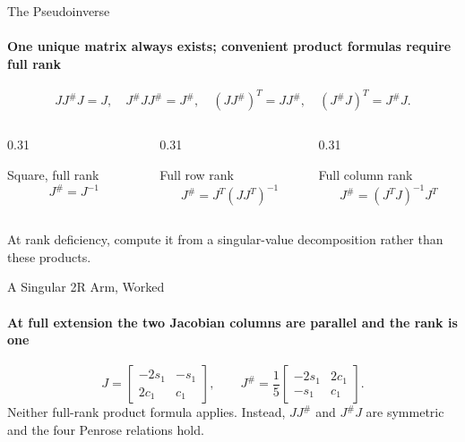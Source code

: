 \documentclass[aspectratio=169]{beamer}
\begin{document}
\begin{frame}[t]{The Pseudoinverse}
    \framesubtitle{One unique matrix always exists; convenient product formulas require full rank}
    \small
    \[
        JJ^{\#}J=J,\quad J^{\#}JJ^{\#}=J^{\#},\quad
        (JJ^{\#})^T=JJ^{\#},\quad(J^{\#}J)^T=J^{\#}J.
    \]
    \begin{columns}[T,onlytextwidth]
        \begin{column}{0.31\textwidth}
            \begin{block}{Square, full rank}
                \[
                    J^{\#}=J^{-1}
                \]
            \end{block}
        \end{column}
        \begin{column}{0.31\textwidth}
            \begin{block}{Full row rank}
                \[
                    J^{\#}=J^T(JJ^T)^{-1}
                \]
            \end{block}
        \end{column}
        \begin{column}{0.31\textwidth}
            \begin{block}{Full column rank}
                \[
                    J^{\#}=(J^TJ)^{-1}J^T
                \]
            \end{block}
        \end{column}
    \end{columns}
    At rank deficiency, compute it from a singular-value decomposition rather than these products.
\end{frame}

\begin{frame}[t]{A Singular 2R Arm, Worked}
    \framesubtitle{At full extension the two Jacobian columns are parallel and the rank is one}
    \[
        J=
        \begin{bmatrix}-2s_1&-s_1\\2c_1&c_1\end{bmatrix},
        \qquad
        J^{\#}=\frac15
        \begin{bmatrix}-2s_1&2c_1\\-s_1&c_1\end{bmatrix}.
    \]
    Neither full-rank product formula applies. Instead, $JJ^{\#}$ and $J^{\#}J$ are symmetric and the four Penrose relations hold.
\end{frame}
\end{document}
